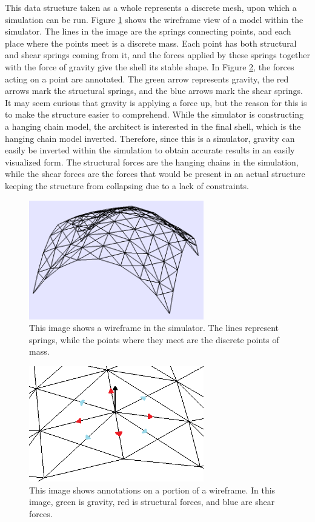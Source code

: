 \documentclass{thesis}
\begin{document}
This data structure taken as a whole represents a discrete mesh, upon which a simulation can be run.  Figure \ref{fig:wireframe} shows
the wireframe view of a model within the simulator.  The lines in the image are the springs connecting points, and each place where
the points meet is a discrete mass.  Each point has both structural and shear springs coming from it, and the forces applied by these
springs together with the force of gravity give the shell its stable shape.  In Figure \ref{fig:wireframe_detail}, the forces acting on
a point are annotated.  The green arrow represents gravity, the red arrows mark the structural springs, and the blue arrows mark the
shear springs.  It may seem curious that gravity is applying a force up, but the reason for this is to make the structure easier to
comprehend.  While the simulator is constructing a hanging chain model, the architect is interested in the final shell, which is
the hanging chain model inverted.  Therefore, since this is a simulator, gravity can easily be inverted within the simulation to
obtain accurate results in an easily visualized form.  The structural forces are the hanging chains in the simulation, while the
shear forces are the forces that would be present in an actual structure keeping the structure from collapsing due to a lack of
constraints.

\begin{figure}
\centering
\includegraphics[width=3in]{images/wireframe.png}
\caption[A wireframe of a simulated model]{This image shows a wireframe in the simulator.  The lines represent springs, while the points
where they meet are the discrete points of mass.}
\label{fig:wireframe}
\end{figure}

\begin{figure}
\centering
\includegraphics[width=3in]{images/wireframe_detail.png}
\caption[Detail of a wireframe of a simulated model]{This image shows annotations on a portion of a wireframe.  In this image, green is
gravity, red is structural forces, and blue are shear forces.}
\label{fig:wireframe_detail}
\end{figure}
\end{document}
